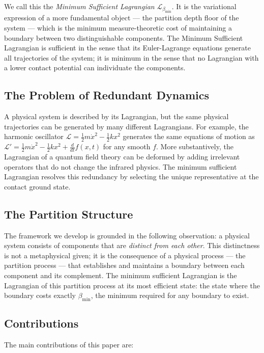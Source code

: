 \documentclass[12pt, a4paper]{article}
\theoremstyle{plain}
\theoremstyle{definition}
\theoremstyle{remark}
\newcommand{\bmin}{\beta_{\min}}
\newcommand{\Lmin}{\mathcal{L}_{\bmin}}
\newcommand{\half}{\tfrac{1}{2}}
\begin{document}
We call this the \emph{Minimum Sufficient Lagrangian} $\Lmin$. It is the
variational expression of a more fundamental object --- the partition depth
floor of the system --- which is the minimum measure-theoretic cost of
maintaining a boundary between two distinguishable components. The Minimum
Sufficient Lagrangian is sufficient in the sense that its Euler-Lagrange
equations generate all trajectories of the system; it is minimum in the sense
that no Lagrangian with a lower contact potential can individuate the components.

\subsection{The Problem of Redundant Dynamics}

A physical system is described by its Lagrangian, but the same physical
trajectories can be generated by many different Lagrangians. For example, the
harmonic oscillator $\mathcal{L} = \half m\dot{x}^2 - \half kx^2$ generates
the same equations of motion as $\mathcal{L}' = \half m\dot{x}^2 - \half kx^2
+ \frac{d}{dt}f(x,t)$ for any smooth $f$. More substantively, the Lagrangian of
a quantum field theory can be deformed by adding irrelevant operators that do not
change the infrared physics. The minimum sufficient Lagrangian resolves this
redundancy by selecting the unique representative at the contact ground state.

\subsection{The Partition Structure}

The framework we develop is grounded in the following observation: a physical
system consists of components that are \emph{distinct from each other}. This
distinctness is not a metaphysical given; it is the consequence of a physical
process --- the partition process --- that establishes and maintains a boundary
between each component and its complement. The minimum sufficient Lagrangian is
the Lagrangian of this partition process at its most efficient state: the state
where the boundary costs exactly $\bmin$, the minimum required for any boundary
to exist.

\subsection{Contributions}

The main contributions of this paper are:
\end{document}
